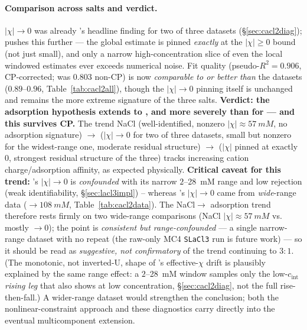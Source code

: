 \documentclass[11pt]{article}
\newcommand{\cint}{c_{\mathrm{int}}}
\begin{document}
\paragraph{Comparison across salts and verdict.} $|\chi|\to0$ was already
's headline finding for two of three datasets (\S\ref{sec:cacl2diag});
 pushes this
further --- the global estimate is pinned \emph{exactly} at the $|\chi|\ge0$
bound (not just small), and only a narrow high-concentration slice of even
the local windowed estimates ever exceeds numerical noise. Fit quality
(pseudo-$R^2=0.906$, CP-corrected; was $0.803$ non-CP) is now
\emph{comparable to or better than} the  datasets
($0.89$--$0.96$, Table~\ref{tab:cacl2all}), though the $|\chi|\to0$ pinning
itself is unchanged and remains the more extreme signature of the three
salts. \textbf{Verdict: the adsorption hypothesis extends to
, and more severely than for  --- and this survives
CP.} The trend NaCl
(well-identified, nonzero $|\chi|\approx\SI{57}{mM}$, no adsorption signature) $\to$  ($|\chi|\to0$ for two
of three datasets, small but nonzero for the widest-range one, moderate
residual structure) $\to$  ($|\chi|$ pinned at exactly
$0$, strongest residual structure of the three) tracks
increasing cation charge/adsorption affinity, as expected physically.
\textbf{Critical caveat for this trend:} 's $|\chi|\to0$ is
\emph{confounded} with its narrow $2$--\SI{28}{mM} range and low
 rejection (weak identifiability, \S\ref{sec:lacl3impl}) --
whereas 's $|\chi|\to0$ came from \emph{wide}-range data
($\to\SI{108}{mM}$, Table~\ref{tab:cacl2data}). The NaCl$\to$
adsorption trend therefore rests firmly on two wide-range comparisons
(NaCl $|\chi|\approx\SI{57}{mM}$ vs.\  mostly $\to0$); the 
point is \emph{consistent but range-confounded} --- a single narrow-range
dataset with no repeat (the raw-only MC4 \texttt{SLaCl3} run is future
work) --- so it should be read as \emph{suggestive, not confirmatory} of
the trend continuing to $3{:}1$. (The monotonic, not inverted-U, shape of
's effective-$\chi$ drift is plausibly explained by the same
range effect: a $2$--\SI{28}{mM} window samples only the low-$\cint$
\emph{rising leg} that  also shows at low concentration,
\S\ref{sec:cacl2diag}, not the full rise-then-fall.) A wider-range
 dataset would strengthen the conclusion; both the
nonlinear-constraint approach and these diagnostics carry directly into
the eventual multicomponent extension.
\end{document}
